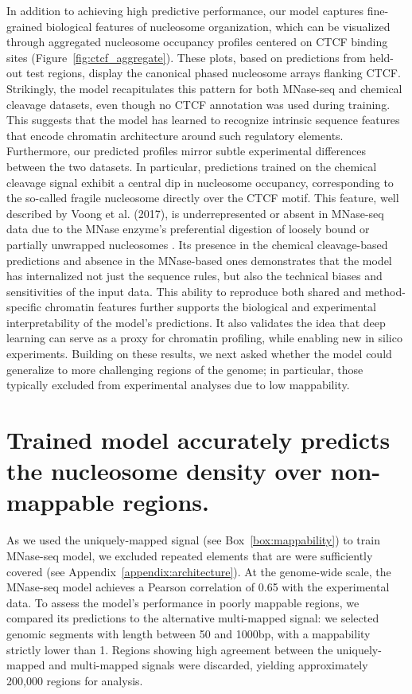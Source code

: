 \documentclass[11pt]{book}
\begin{document}
In addition to achieving high predictive performance, our model captures fine-grained biological features of nucleosome organization, which can be visualized through aggregated nucleosome occupancy profiles centered on CTCF binding sites (Figure~\ref{fig:ctcf_aggregate}). These plots, based on predictions from held-out test regions, display the canonical phased nucleosome arrays flanking CTCF. Strikingly, the model recapitulates this pattern for both MNase-seq and chemical cleavage datasets, even though no CTCF annotation was used during training. This suggests that the model has learned to recognize intrinsic sequence features that encode chromatin architecture around such regulatory elements.
Furthermore, our predicted profiles mirror subtle experimental differences between the two datasets. In particular, predictions trained on the chemical cleavage signal exhibit a central dip in nucleosome occupancy, corresponding to the so-called fragile nucleosome directly over the CTCF motif. This feature, well described by Voong et al. (2017), is underrepresented or absent in MNase-seq data due to the MNase enzyme’s preferential digestion of loosely bound or partially unwrapped nucleosomes \cite{voong_genome-wide_2017}. Its presence in the chemical cleavage-based predictions and absence in the MNase-based ones demonstrates that the model has internalized not just the sequence rules, but also the technical biases and sensitivities of the input data.
This ability to reproduce both shared and method-specific chromatin features further supports the biological and experimental interpretability of the model’s predictions. It also validates the idea that deep learning can serve as a proxy for chromatin profiling, while enabling new in silico experiments.
Building on these results, we next asked whether the model could generalize to more challenging regions of the genome; in particular, those typically excluded from experimental analyses due to low mappability.

\section{Trained model accurately predicts the nucleosome density over non-mappable regions.}

As we used the uniquely-mapped signal (see Box~\ref{box:mappability}) to train MNase-seq model, we excluded repeated elements that are were sufficiently covered (see Appendix~\ref{appendix:architecture}). At the genome-wide scale, the MNase-seq model achieves a Pearson correlation of 0.65 with the experimental data. To assess the model's performance in poorly mappable regions, we compared its predictions to the alternative multi-mapped signal: we selected genomic segments with length between 50 and 1000bp, with a mappability strictly lower than 1. Regions showing high agreement between the uniquely-mapped and multi-mapped signals were discarded, yielding approximately 200{,}000 regions for analysis.
\end{document}
